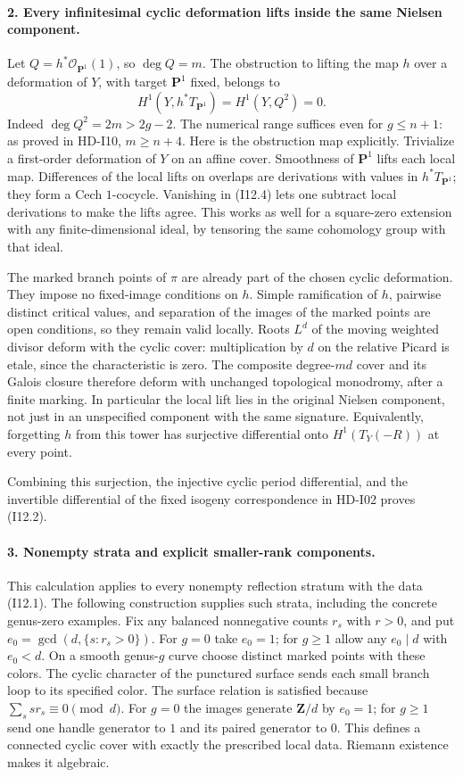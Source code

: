 \paragraph{2. Every infinitesimal cyclic deformation lifts inside the same
Nielsen component.}
Let $Q=h^*\mathcal O_{\mathbf P^1}(1)$, so $\deg Q=m$.
The obstruction to lifting the map $h$ over a deformation of $Y$,
with target $\mathbf P^1$ fixed, belongs to
\[
 H^1(Y,h^*T_{\mathbf P^1})=H^1(Y,Q^2)=0.
 \tag{I12.4}
\]
Indeed $\deg Q^2=2m>2g-2$.  The numerical range suffices even for
$g\leq n+1$: as proved in HD-I10, $m\geq n+4$.
Here is the obstruction map explicitly.  Trivialize a first-order
deformation of $Y$ on an affine cover.  Smoothness of $\mathbf P^1$
lifts each local map.  Differences of the local lifts on overlaps are
derivations with values in $h^*T_{\mathbf P^1}$; they form a Cech
$1$-cocycle.  Vanishing in (I12.4) lets one subtract local derivations
to make the lifts agree.  This works as well for a square-zero
extension with any finite-dimensional ideal, by tensoring the same
cohomology group with that ideal.

The marked branch points of $\pi$ are already part of the chosen cyclic
deformation.  They impose no fixed-image conditions on $h$.
Simple ramification of $h$, pairwise distinct critical values, and
separation of the images of the marked points are open conditions,
so they remain valid locally.  Roots $L^d$ of the moving weighted
divisor deform with the cyclic cover: multiplication by $d$ on the
relative Picard is etale, since the characteristic is zero.
The composite degree-$md$ cover and its Galois closure therefore deform
with unchanged topological monodromy, after a finite marking.  In
particular the local lift lies in the original Nielsen component,
not just in an unspecified component with the same signature.
Equivalently, forgetting $h$ from this tower has surjective differential
onto $H^1(T_Y(-R))$ at every point.

Combining this surjection, the injective cyclic period differential,
and the invertible differential of the fixed isogeny correspondence
in HD-I02 proves (I12.2).

\paragraph{3. Nonempty strata and explicit smaller-rank components.}
This calculation applies to every nonempty reflection stratum with
the data (I12.1).  The following construction supplies such strata,
including the concrete genus-zero examples.
Fix any balanced nonnegative counts $r_s$ with $r>0$, and put
$e_0=\gcd(d,\{s:r_s>0\})$.  For $g=0$ take $e_0=1$; for $g\geq1$
allow any $e_0\mid d$ with $e_0<d$.  On a smooth genus-$g$ curve choose
distinct marked points with these colors.  The cyclic character of the
punctured surface sends each small branch loop to its specified color.
The surface relation is satisfied because $\sum_s s r_s\equiv0\pmod d$.
For $g=0$ the images generate $\mathbf Z/d$ by $e_0=1$; for $g\geq1$
send one handle generator to $1$ and its paired generator to $0$.
This defines a connected cyclic cover with exactly the prescribed
local data.  Riemann existence makes it algebraic.

